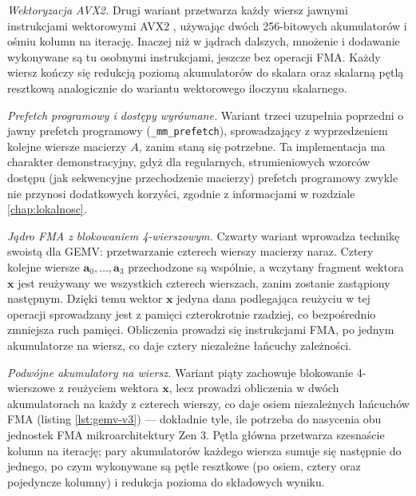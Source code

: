 \documentclass[a4paper,12pt]{book} %
\begin{document}
\emph{Wektoryzacja AVX2.} Drugi wariant przetwarza każdy wiersz jawnymi instrukcjami wektorowymi AVX2 \cite{gepner2017avx2}, używając dwóch 256-bitowych akumulatorów i ośmiu kolumn na iterację. Inaczej niż w jądrach dalszych, mnożenie i dodawanie wykonywane są tu osobnymi instrukcjami, jeszcze bez operacji FMA. Każdy wiersz kończy się redukcją poziomą akumulatorów do skalara oraz skalarną pętlą resztkową analogicznie do wariantu wektorowego iloczynu skalarnego.

\emph{Prefetch programowy i dostępy wyrównane.} Wariant trzeci uzupełnia poprzedni o jawny prefetch programowy (\texttt{\_mm\_prefetch}), sprowadzający z wyprzedzeniem kolejne wiersze macierzy $A$, zanim staną się potrzebne. Ta implementacja ma charakter demonstracyjny, gdyż dla regularnych, strumieniowych wzorców dostępu (jak sekwencyjne przechodzenie macierzy) prefetch programowy zwykle nie przynosi dodatkowych korzyści, zgodnie z informacjami w rozdziale \ref{chap:lokalnosc}.

\emph{Jądro FMA z blokowaniem 4-wierszowym.} Czwarty wariant wprowadza technikę swoistą dla GEMV: przetwarzanie czterech wierszy macierzy naraz. Cztery kolejne wiersze $\mathbf{a}_0, \dots, \mathbf{a}_3$ przechodzone są wspólnie, a wczytany fragment wektora $\mathbf{x}$ jest reużywany we wszystkich czterech wierszach, zanim zostanie zastąpiony następnym. Dzięki temu wektor $\mathbf{x}$ jedyna dana podlegająca reużyciu w tej operacji sprowadzany jest z pamięci czterokrotnie rzadziej, co bezpośrednio zmniejsza ruch pamięci. Obliczenia prowadzi się instrukcjami FMA, po jednym akumulatorze na wiersz, co daje cztery niezależne łańcuchy zależności.

\emph{Podwójne akumulatory na wiersz.} Wariant piąty zachowuje blokowanie 4-wierszowe z reużyciem wektora $\mathbf{x}$, lecz prowadzi obliczenia w dwóch akumulatorach na każdy z czterech wierszy, co daje osiem niezależnych łańcuchów FMA (listing \ref{lst:gemv-v3}) --- dokładnie tyle, ile potrzeba do nasycenia obu jednostek FMA mikroarchitektury Zen 3. Pętla główna przetwarza szesnaście kolumn na iterację; pary akumulatorów każdego wiersza sumuje się następnie do jednego, po czym wykonywane są pętle resztkowe (po osiem, cztery oraz pojedyncze kolumny) i redukcja pozioma do składowych wyniku.
\end{document}
